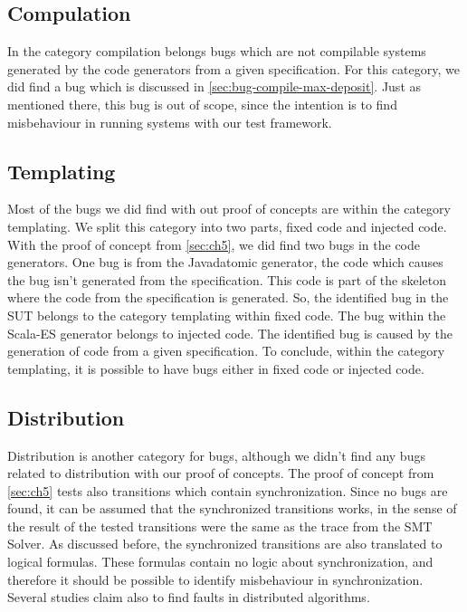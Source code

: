 \subsection{Compulation}
In the category compilation belongs bugs which are not compilable systems generated by the code generators from a given specification. For this category, we did find a bug which is discussed in \autoref{sec:bug-compile-max-deposit}. Just as mentioned there, this bug is out of scope, since the intention is to find misbehaviour in running systems with our test framework.

\subsection{Templating}
Most of the bugs we did find with out proof of concepts are within the category templating. We split this category into two parts, fixed code and injected code. With the proof of concept from \autoref{sec:ch5}, we did find two bugs in the code generators. One bug is from the Javadatomic generator, the code which causes the bug isn't generated from the specification. This code is part of the skeleton where the code from the specification is generated. So, the identified bug in the SUT belongs to the category templating within fixed code. The bug within the Scala-ES generator belongs to injected code. The identified bug is caused by the generation of code from a given specification. To conclude, within the category templating, it is possible to have bugs either in fixed code or injected code.

\subsection{Distribution}
Distribution is another category for bugs, although we didn't find any bugs related to distribution with our proof of concepts. The proof of concept from \autoref{sec:ch5} tests also transitions which contain synchronization. Since no bugs are found, it can be assumed that the synchronized transitions works, in the sense of the result of the tested transitions were the same as the trace from the SMT Solver. As discussed before, the synchronized transitions are also translated to logical formulas. These formulas contain no logic about synchronization, and therefore it should be possible to identify misbehaviour in synchronization. Several studies claim also to find faults in distributed algorithms.

